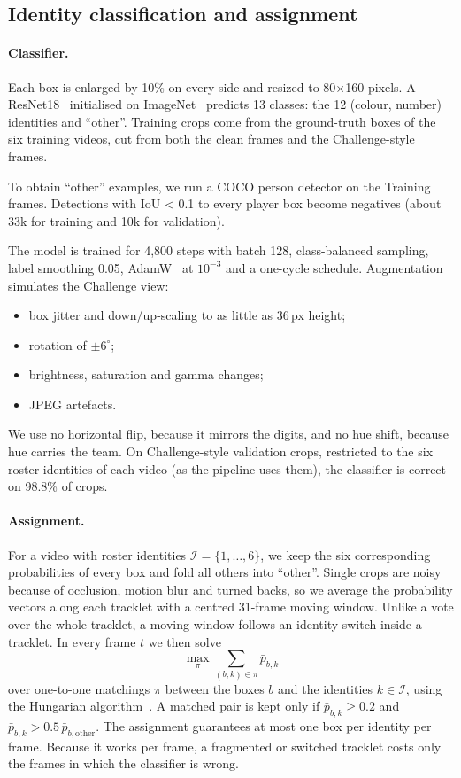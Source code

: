 \documentclass[11pt,a4paper]{article}
\begin{document}
\subsection{Identity classification and assignment}
\label{sec:id}
\paragraph{Classifier.}
Each box is enlarged by 10\% on every side and resized to 80$\times$160 pixels. A ResNet18~\cite{resnet}
initialised on ImageNet~\cite{imagenet} predicts 13 classes: the 12 (colour, number) identities and
``other''. Training crops come from the ground-truth boxes of the six training videos, cut from both the
clean frames and the Challenge-style frames.

To obtain ``other'' examples, we run a COCO person detector on the Training frames. Detections with
IoU < 0.1 to every player box become negatives (about 33k for training and 10k for validation).

The model is trained for 4{,}800 steps with batch 128, class-balanced sampling, label smoothing 0.05,
AdamW~\cite{adamw} at $10^{-3}$ and a one-cycle schedule. Augmentation simulates the Challenge view:
\begin{itemize}
\item box jitter and down/up-scaling to as little as 36\,px height;
\item rotation of $\pm6^\circ$;
\item brightness, saturation and gamma changes;
\item JPEG artefacts.
\end{itemize}
We use no horizontal flip, because it mirrors the digits, and no hue shift, because hue carries the team.
On Challenge-style validation crops, restricted to the six roster identities of each video (as the
pipeline uses them), the classifier is correct on 98.8\% of crops.

\paragraph{Assignment.}
For a video with roster identities $\mathcal{I} = \{1,\dots,6\}$, we keep the six corresponding
probabilities of every box and fold all others into ``other''. Single crops are noisy because of
occlusion, motion blur and turned backs, so we average the probability vectors along each tracklet with a
centred 31-frame moving window. Unlike a vote over the whole tracklet, a moving window follows an
identity switch inside a tracklet. In every frame $t$ we then solve
\begin{equation}
\max_{\pi} \sum_{(b,k) \in \pi} \bar{p}_{b,k}
\end{equation}
over one-to-one matchings $\pi$ between the boxes $b$ and the identities $k \in \mathcal{I}$, using the
Hungarian algorithm~\cite{kuhn}. A matched pair is kept only if $\bar{p}_{b,k} \geq 0.2$ and
$\bar{p}_{b,k} > 0.5\,\bar{p}_{b,\text{other}}$. The assignment guarantees at most one box per identity
per frame. Because it works per frame, a fragmented or switched tracklet costs only the frames in which
the classifier is wrong.
\end{document}
